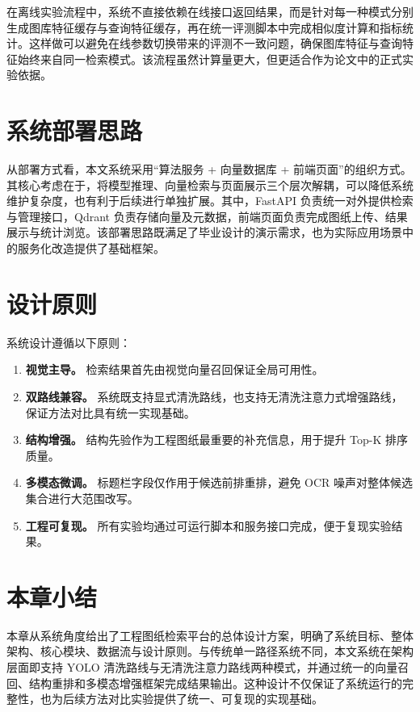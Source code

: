 在离线实验流程中，系统不直接依赖在线接口返回结果，而是针对每一种模式分别生成图库特征缓存与查询特征缓存，再在统一评测脚本中完成相似度计算和指标统计。这样做可以避免在线参数切换带来的评测不一致问题，确保图库特征与查询特征始终来自同一检索模式。该流程虽然计算量更大，但更适合作为论文中的正式实验依据。

\section{系统部署思路}

从部署方式看，本文系统采用“算法服务 + 向量数据库 + 前端页面”的组织方式。其核心考虑在于，将模型推理、向量检索与页面展示三个层次解耦，可以降低系统维护复杂度，也有利于后续进行单独扩展。其中，FastAPI 负责统一对外提供检索与管理接口，Qdrant 负责存储向量及元数据，前端页面负责完成图纸上传、结果展示与统计浏览。该部署思路既满足了毕业设计的演示需求，也为实际应用场景中的服务化改造提供了基础框架。

\section{设计原则}

系统设计遵循以下原则：

\begin{enumerate}
  \item \textbf{视觉主导。} 检索结果首先由视觉向量召回保证全局可用性。
  \item \textbf{双路线兼容。} 系统既支持显式清洗路线，也支持无清洗注意力式增强路线，保证方法对比具有统一实现基础。
  \item \textbf{结构增强。} 结构先验作为工程图纸最重要的补充信息，用于提升 Top-K 排序质量。
  \item \textbf{多模态微调。} 标题栏字段仅作用于候选前排重排，避免 OCR 噪声对整体候选集合进行大范围改写。
  \item \textbf{工程可复现。} 所有实验均通过可运行脚本和服务接口完成，便于复现实验结果。
\end{enumerate}

\section{本章小结}

本章从系统角度给出了工程图纸检索平台的总体设计方案，明确了系统目标、整体架构、核心模块、数据流与设计原则。与传统单一路径系统不同，本文系统在架构层面即支持 YOLO 清洗路线与无清洗注意力路线两种模式，并通过统一的向量召回、结构重排和多模态增强框架完成结果输出。这种设计不仅保证了系统运行的完整性，也为后续方法对比实验提供了统一、可复现的实现基础。
